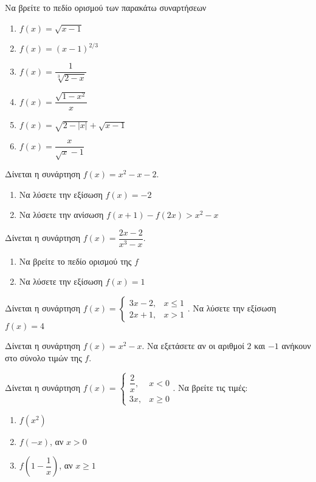 \documentclass{../../presentation}
\begin{document}
\begin{askisi}
  Να βρείτε το πεδίο ορισμού των παρακάτω συναρτήσεων
  \begin{enumerate}[<+->]
    \item $f(x)=\sqrt{x-1}$
    \item $f(x)=(x-1)^{2/3}$
    \item $f(x)=\dfrac{1}{\sqrt[3]{2-x}}$
    \item $f(x)=\dfrac{\sqrt{1-x^2}}{x}$
    \item $f(x)=\sqrt{2-|x|}+\sqrt{x-1}$
    \item $f(x)=\dfrac{x}{\sqrt{x}-1}$
  \end{enumerate}
\end{askisi}

\begin{askisi}
  Δίνεται η συνάρτηση $f(x)=x^2-x-2$.
  \begin{enumerate}[<+->]
    \item Να λύσετε την εξίσωση $f(x)=-2$
    \item Να λύσετε την ανίσωση $f(x+1)-f(2x)>x^2-x$
  \end{enumerate}
\end{askisi}

\begin{askisi}
  Δίνεται η συνάρτηση $f(x)=\dfrac{2x-2}{x^3-x}$.
  \begin{enumerate}[<+->]
    \item Να βρείτε το πεδίο ορισμού της $f$
    \item Να λύσετε την εξίσωση $f(x)=1$
  \end{enumerate}
\end{askisi}

\begin{askisi}
  Δίνεται η συνάρτηση $f(x)=\begin{cases}
      3x-2, & x\le 1 \\
      2x+1, & x>1
    \end{cases}$. Να λύσετε την εξίσωση $f(x)=4$
\end{askisi}

\begin{askisi}
  Δίνεται η συνάρτηση $f(x)=x^2-x$. Να εξετάσετε αν οι αριθμοί $2$ και $-1$ ανήκουν στο σύνολο τιμών της $f$.
\end{askisi}

\begin{askisi}
  Δίνεται η συνάρτηση $f(x)=\begin{cases}
      \dfrac{2}{x}, & x< 0    \\
      3x,           & x \ge 0
    \end{cases}$. Να βρείτε τις τιμές:
  \begin{enumerate}[<+->]
    \item $f(x^2)$
    \item $f(-x)$, αν $x>0$
    \item $f\left(1-\dfrac{1}{x}\right)$, αν $x\ge 1$
  \end{enumerate}
\end{askisi}
\end{document}
